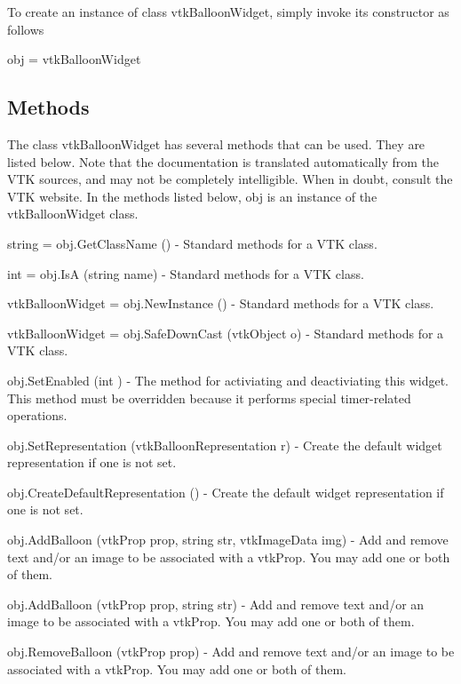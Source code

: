 To create an instance of class vtk\-Balloon\-Widget, simply invoke its constructor as follows \begin{DoxyVerb}  obj = vtkBalloonWidget
\end{DoxyVerb}
 \hypertarget{vtkwidgets_vtkxyplotwidget_Methods}{}\subsection{Methods}\label{vtkwidgets_vtkxyplotwidget_Methods}
The class vtk\-Balloon\-Widget has several methods that can be used. They are listed below. Note that the documentation is translated automatically from the V\-T\-K sources, and may not be completely intelligible. When in doubt, consult the V\-T\-K website. In the methods listed below, {\ttfamily obj} is an instance of the vtk\-Balloon\-Widget class. 
\begin{DoxyItemize}
\item {\ttfamily string = obj.\-Get\-Class\-Name ()} -\/ Standard methods for a V\-T\-K class.  
\item {\ttfamily int = obj.\-Is\-A (string name)} -\/ Standard methods for a V\-T\-K class.  
\item {\ttfamily vtk\-Balloon\-Widget = obj.\-New\-Instance ()} -\/ Standard methods for a V\-T\-K class.  
\item {\ttfamily vtk\-Balloon\-Widget = obj.\-Safe\-Down\-Cast (vtk\-Object o)} -\/ Standard methods for a V\-T\-K class.  
\item {\ttfamily obj.\-Set\-Enabled (int )} -\/ The method for activiating and deactiviating this widget. This method must be overridden because it performs special timer-\/related operations.  
\item {\ttfamily obj.\-Set\-Representation (vtk\-Balloon\-Representation r)} -\/ Create the default widget representation if one is not set.  
\item {\ttfamily obj.\-Create\-Default\-Representation ()} -\/ Create the default widget representation if one is not set.  
\item {\ttfamily obj.\-Add\-Balloon (vtk\-Prop prop, string str, vtk\-Image\-Data img)} -\/ Add and remove text and/or an image to be associated with a vtk\-Prop. You may add one or both of them.  
\item {\ttfamily obj.\-Add\-Balloon (vtk\-Prop prop, string str)} -\/ Add and remove text and/or an image to be associated with a vtk\-Prop. You may add one or both of them.  
\item {\ttfamily obj.\-Remove\-Balloon (vtk\-Prop prop)} -\/ Add and remove text and/or an image to be associated with a vtk\-Prop. You may add one or both of them.  

\end{DoxyItemize}
